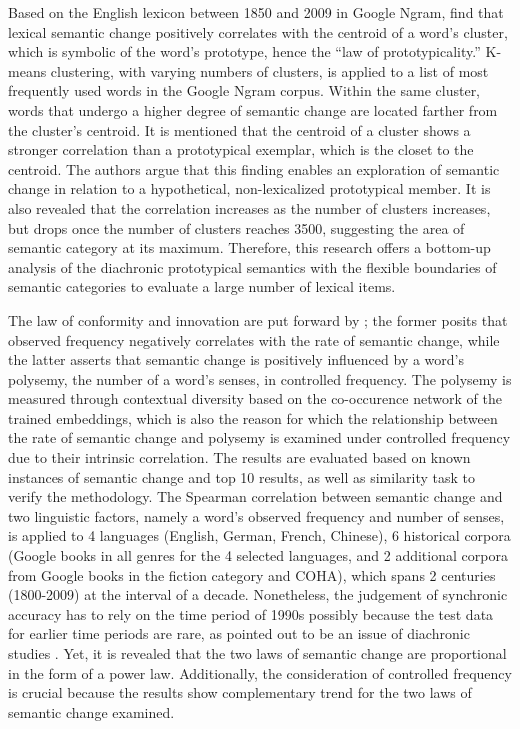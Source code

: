 Based on the English lexicon between 1850 and 2009 in Google Ngram, \textcite{dubossarsky2015bottom} find that lexical semantic change positively correlates with the centroid of a word's cluster, which is symbolic of the word's prototype, hence the ``law of prototypicality.'' K-means clustering, with varying numbers of clusters, is applied to a list of most frequently used words in the Google Ngram corpus. Within the same cluster, words that undergo a higher degree of semantic change are located farther from the cluster's centroid. It is mentioned that the centroid of a cluster shows a stronger correlation than a prototypical exemplar, which is the closet to the centroid. The authors argue that this finding enables an exploration of semantic change in relation to a hypothetical, non-lexicalized prototypical member. It is also revealed that the correlation increases as the number of clusters increases, but drops once the number of clusters reaches 3500, suggesting the area of semantic category at its maximum. Therefore, this research offers a bottom-up analysis of the diachronic prototypical semantics with the flexible boundaries of semantic categories to evaluate a large number of lexical items.

The law of conformity and innovation are put forward by \textcite{hamilton2016law}; the former posits that observed frequency negatively correlates with the rate of semantic change, while the latter asserts that semantic change is positively influenced by a word's polysemy, the number of a word's senses, in controlled frequency. The polysemy is measured through contextual diversity based on the co-occurence network of the trained embeddings, which is also the reason for which the relationship between the rate of semantic change and polysemy is examined under controlled frequency due to their intrinsic correlation. The results are evaluated based on known instances of semantic change and top 10 results, as well as similarity task to verify the methodology. The Spearman correlation between semantic change and two linguistic factors, namely a word's observed frequency and number of senses, is applied to 4 languages (English, German, French, Chinese), 6 historical corpora (Google books in all genres for the 4 selected languages, and 2 additional corpora from Google books in the fiction category and COHA), which spans 2 centuries (1800-2009) at the interval of a decade. Nonetheless, the judgement of synchronic accuracy has to rely on the time period of 1990s possibly because the test data for earlier time periods are rare, as pointed out to be an issue of diachronic studies \parencite{wevers2020digital}. Yet, it is revealed that the two laws of semantic change are proportional in the form of a power law. Additionally, the consideration of controlled frequency is crucial because the results show complementary trend for the two laws of semantic change examined.

